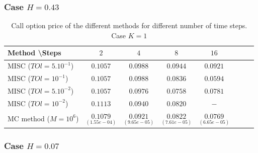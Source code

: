 \documentclass[11pt]{article}
\begin{document}
\subsubsection*{Case $H=0.43$}
\begin{table}[h!]
	\centering
	\begin{tabular}{l*{6}{c}r}
		Method \textbackslash  Steps            & $2$ & $4$ & $8$ & $16$ &   \\
		\hline
		MISC ($TOl=5.10^{-1}$)  & $0.1057$ & $0.0988$ & $0.0944$ & $0.0921$  \\
		MISC ($TOl=10^{-1}$)  & $0.1057$ & $0.0988$ & $0.0836$ & $0.0594$  \\
		MISC ($TOl=5.10^{-2}$)  & $0.1057$ & $0.0976$ & $0.0758$ & $0.0781$  \\
		MISC ($TOl=10^{-2}$)  & $0.1113$ & $0.0940$ & $0.0820$ & $-$  \\
		MC method ($M=10^{6}$)   & $\underset{(1.55e-04)}{0.1079}$ & $ \underset{(9.65e-05)}{0.0921}$  & $ \underset{(7.61e-05)}{0.0822}$ & $ \underset{(6.65e-05)}{0.0769}$ \\		
		
		\hline
	\end{tabular}
	\caption{ Call option price of the different methods for different number of time steps. Case $K=1$}
	\label{table: Call option price of the different methods for different number of time steps. Case $K=1$}
\end{table}


\subsubsection*{Case $H=0.07$}
\end{document}
